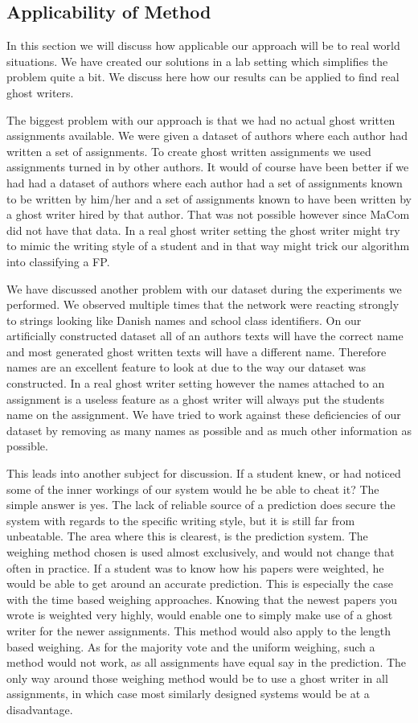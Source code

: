 \subsection{Applicability of Method}\label{sec:app_of_method}

In this section we will discuss how applicable our approach will be to real
world situations. We have created our solutions in a lab setting which
simplifies the problem quite a bit. We discuss here how our results can be
applied to find real ghost writers.

The biggest problem with our approach is that we had no actual ghost written
assignments available. We were given a dataset of authors where each author had
written a set of assignments. To create ghost written assignments we used
assignments turned in by other authors. It would of course have been better if
we had had a dataset of authors where each author had a set of assignments known
to be written by him/her and a set of assignments known to have been written by
a ghost writer hired by that author. That was not possible however since MaCom
did not have that data. In a real ghost writer setting the ghost writer might
try to mimic the writing style of a student and in that way might trick our
algorithm into classifying a \gls{FP}.

We have discussed another problem with our dataset during the experiments we
performed. We observed multiple times that the network were reacting strongly
to strings looking like Danish names and school class identifiers. On our
artificially constructed dataset all of an authors texts will have the correct
name and most generated ghost written texts will have a different name.
Therefore names are an excellent feature to look at due to the way our dataset
was constructed. In a real ghost writer setting however the names attached to an
assignment is a useless feature as a ghost writer will always put the students
name on the assignment. We have tried to work against these deficiencies of our
dataset by removing as many names as possible and as much other information as
possible.

This leads into another subject for discussion. If a student knew, or had
noticed some of the inner workings of our system would he be able to cheat it?
The simple answer is yes. The lack of reliable source of a prediction does
secure the system with regards to the specific writing style, but it is still
far from unbeatable. The area where this is clearest, is the prediction system.
The weighing method chosen is used almost exclusively, and would not change that
often in practice. If a student was to know how his papers were weighted, he
would be able to get around an accurate prediction. This is especially the case
with the time based weighing approaches. Knowing that the newest papers you
wrote is weighted very highly, would enable one to simply make use of a ghost
writer for the newer assignments. This method would also apply to the length
based weighing. As for the majority vote and the uniform weighing, such a method
would not work, as all assignments have equal say in the prediction. The only way
around those weighing method would be to use a ghost writer in all assignments,
in which case most similarly designed systems would be at a disadvantage.

